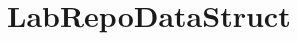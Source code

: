 \chapter{Lab\+Repo\+Data\+Struct}
\hypertarget{md__r_e_a_d_m_e}{}\label{md__r_e_a_d_m_e}
\label{md__r_e_a_d_m_e_autotoc_md0}%
%
